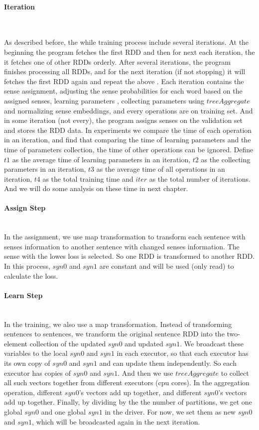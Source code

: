 \paragraph{Iteration}\ 

As described before, the while training process include several iterations. At the beginning the program fetches the first RDD and then for next each iteration, the it fetches one of other RDDs orderly. After several iterations, the program finishes processing all RDDs, and for the next iteration (if not stopping) it will fetches the first RDD again and repeat the above . Each iteration contains the sense assignment, adjusting the sense probabilities for each word based on the assigned senses, learning parameters , collecting parameters using $treeAggregate$ and normalizing sense embeddings, and every operations are on training set. And in some iteration (not every), the program assigns senses on the validation set and stores the RDD data. In experiments we compare the time of each operation in an iteration, and find that comparing the time of learning parameters and the time of parameters collection, the time of other operations can be ignored. Define $t1$ as the average time of learning parameters in an iteration, $t2$ as the collecting parameters in an iteration, $t3$ as the average time of all operations in an iteration, $t4$ as the total training time and $iter$ as the total number of iterations. And we will do some analysis on these time in next chapter.


\paragraph{Assign Step}\ \\
In the assignment, we use map transformation to transform each sentence with senses information to another sentence with changed senses information. The sense with the lowes loss is selected. So one RDD is transformed to another RDD. In this process, $syn0$ and $syn1$ are constant and will be used (only read) to calculate the loss. 


\paragraph{Learn Step}\ \\
In the training, we also use a map transformation. Instead of transforming sentences to sentences, we transform the original sentence RDD into the two-element collection of the updated $syn0$ and updated $syn1$. We broadcast these variables to the local $syn0$ and $syn1$ in each executor, so that each executor has its own  copy of $syn0$ and $syn1$ and can update them independently. So each executor has copies of $syn0$ and $syn1$. And then we use $treeAggregate$ to collect all such vectors together from different executors (cpu cores).  In the aggregation operation, different $syn0$'s vectors add up together, and different $syn0$'s vectors add up together. Finally, by dividing by the the number of partitions, we get one global $syn0$ and one global $syn1$ in the driver. For now, we set them as new $syn0$ and $syn1$, which will be broadcasted again in the next iteration. 

